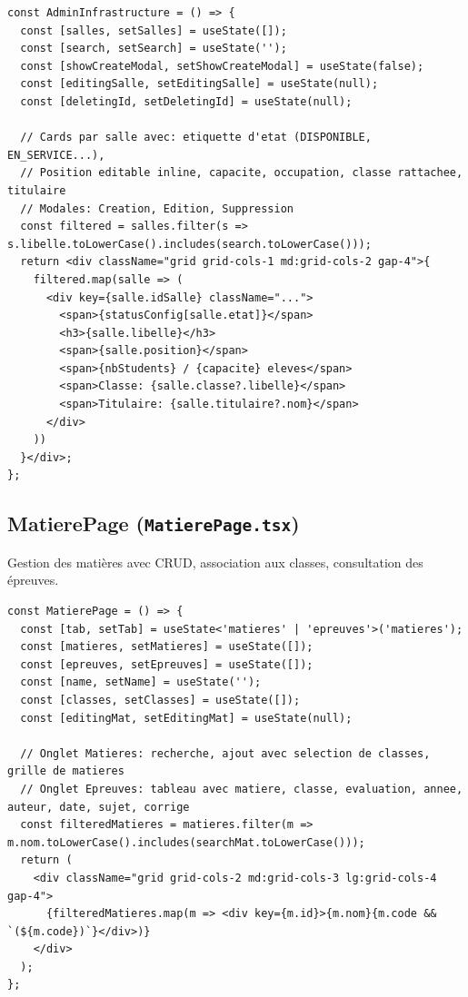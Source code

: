 \documentclass[12pt,a4paper]{article}
\begin{document}
\begin{lstlisting}[style=code]
const AdminInfrastructure = () => {
  const [salles, setSalles] = useState([]);
  const [search, setSearch] = useState('');
  const [showCreateModal, setShowCreateModal] = useState(false);
  const [editingSalle, setEditingSalle] = useState(null);
  const [deletingId, setDeletingId] = useState(null);

  // Cards par salle avec: etiquette d'etat (DISPONIBLE, EN_SERVICE...),
  // Position editable inline, capacite, occupation, classe rattachee, titulaire
  // Modales: Creation, Edition, Suppression
  const filtered = salles.filter(s => s.libelle.toLowerCase().includes(search.toLowerCase()));
  return <div className="grid grid-cols-1 md:grid-cols-2 gap-4">{
    filtered.map(salle => (
      <div key={salle.idSalle} className="...">
        <span>{statusConfig[salle.etat]}</span>
        <h3>{salle.libelle}</h3>
        <span>{salle.position}</span>
        <span>{nbStudents} / {capacite} eleves</span>
        <span>Classe: {salle.classe?.libelle}</span>
        <span>Titulaire: {salle.titulaire?.nom}</span>
      </div>
    ))
  }</div>;
};
\end{lstlisting}

\subsection{MatierePage (\texttt{MatierePage.tsx})}

Gestion des matières avec CRUD, association aux classes, consultation des épreuves.

\begin{lstlisting}[style=code]
const MatierePage = () => {
  const [tab, setTab] = useState<'matieres' | 'epreuves'>('matieres');
  const [matieres, setMatieres] = useState([]);
  const [epreuves, setEpreuves] = useState([]);
  const [name, setName] = useState('');
  const [classes, setClasses] = useState([]);
  const [editingMat, setEditingMat] = useState(null);

  // Onglet Matieres: recherche, ajout avec selection de classes, grille de matieres
  // Onglet Epreuves: tableau avec matiere, classe, evaluation, annee, auteur, date, sujet, corrige
  const filteredMatieres = matieres.filter(m => m.nom.toLowerCase().includes(searchMat.toLowerCase()));
  return (
    <div className="grid grid-cols-2 md:grid-cols-3 lg:grid-cols-4 gap-4">
      {filteredMatieres.map(m => <div key={m.id}>{m.nom}{m.code && `(${m.code})`}</div>)}
    </div>
  );
};
\end{lstlisting}
\end{document}

